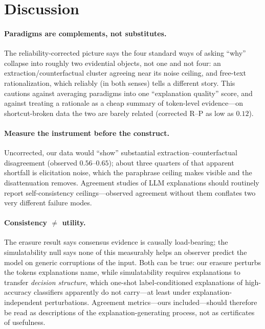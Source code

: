 \documentclass[11pt]{article}
\begin{document}
\section{Discussion}
\label{sec:discussion}

\paragraph{Paradigms are complements, not substitutes.} The reliability-corrected picture says the four standard ways of asking ``why'' collapse into roughly two evidential objects, not one and not four: an extraction/counterfactual cluster agreeing near its noise ceiling, and free-text rationalization, which reliably (in both senses) tells a different story. This cautions against averaging paradigms into one ``explanation quality'' score, and against treating a rationale as a cheap summary of token-level evidence---on shortcut-broken data the two are barely related (corrected R--P as low as $0.12$).

\paragraph{Measure the instrument before the construct.} Uncorrected, our data would ``show'' substantial extraction--counterfactual disagreement (observed $0.56$--$0.65$); about three quarters of that apparent shortfall is elicitation noise, which the paraphrase ceiling makes visible and the disattenuation removes. Agreement studies of LLM explanations should routinely report self-consistency ceilings---observed agreement without them conflates two very different failure modes.

\paragraph{Consistency $\neq$ utility.} The erasure result says consensus evidence is causally load-bearing; the simulatability null says none of this measurably helps an observer predict the model on generic corruptions of the input. Both can be true: our erasure perturbs the tokens explanations name, while simulatability requires explanations to transfer \emph{decision structure}, which one-shot label-conditioned explanations of high-accuracy classifiers apparently do not carry---at least under explanation-independent perturbations. Agreement metrics---ours included---should therefore be read as descriptions of the explanation-generating process, not as certificates of usefulness.
\end{document}
